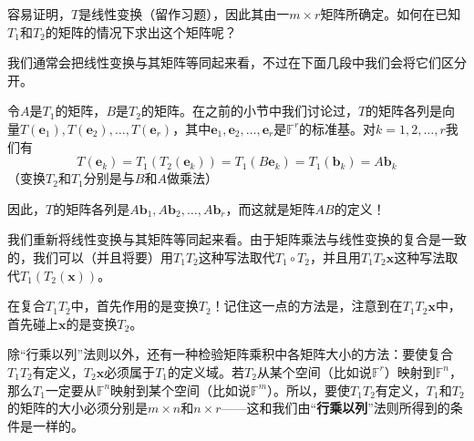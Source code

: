容易证明，$T$是线性变换（留作习题），因此其由一$m\times r$矩阵所确定。如何在已知$T_1$和$T_2$的矩阵的情况下求出这个矩阵呢？

\begin{remark*}
    我们通常会把线性变换与其矩阵等同起来看，不过在下面几段中我们会将它们区分开。
\end{remark*}

令$A$是$T_1$的矩阵，$B$是$T_2$的矩阵。在之前的小节中我们讨论过，$T$的矩阵各列是向量$T(\mathbf{e}_{1}),T(\mathbf{e}_{2}),\ldots,T(\mathbf{e}_{r})$，其中$\mathbf{e}_1,\mathbf{e}_2,\ldots,\mathbf{e}_r$是$\mathbb{F}^r$的标准基。对$k=1,2,\ldots,r$我们有\[T(\mathbf{e}_k)=T_1(T_2(\mathbf{e}_k))=T_1(B\mathbf{e}_k)=T_1(\mathbf{b}_k)=A\mathbf{b}_k\]
（变换$T_2$和$T_1$分别是与$B$和$A$做乘法）

因此，$T$的矩阵各列是$A\mathbf{b}_{1},A\mathbf{b}_{2},\ldots,A\mathbf{b}_{r}$，而这就是矩阵$AB$的定义！

我们重新将线性变换与其矩阵等同起来看。由于矩阵乘法与线性变换的复合是一致的，我们可以（并且将要）用$T_1T_2$这种写法取代$T_1\circ T_2$，并且用$T_{1}T_{2}\mathbf{x}$这种写法取代$T_{1}(T_{2}(\mathbf{x}))$。

\begin{remark*}
    在复合$T_1T_2$中，首先作用的是变换$T_2$！记住这一点的方法是，注意到在$T_1T_2\mathbf{x}$中，首先碰上$\mathbf{x}$的是变换$T_2$。
\end{remark*}

\begin{remark*}
    除“行乘以列”法则以外，还有一种检验矩阵乘积中各矩阵大小的方法：要使复合$T_1T_2$有定义，$T_2\mathbf{x}$必须属于$T_1$的定义域。若$T_2$从某个空间（比如说$\mathbb{F}^r$）映射到$\mathbb{F}^n$，那么$T_1$一定要从$\mathbb{F}^n$映射到某个空间（比如说$\mathbb{F}^m$）。所以，要使$T_1T_2$有定义，$T_1$和$T_2$的矩阵的大小必须分别是$m\times n$和$n\times r$——这和我们由“{\bf 行乘以列}”法则所得到的条件是一样的。
\end{remark*}

